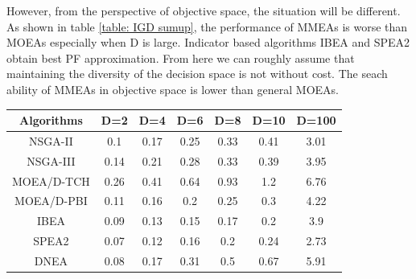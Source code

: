 \documentclass[conference]{IEEEtran}
\begin{document}
 However, from the perspective of objective space, the situation will be different. As shown in table \ref{table: IGD sumup}, the performance of MMEAs is worse than MOEAs especially when D is large. Indicator based algorithms IBEA and SPEA2 obtain best PF approximation. From here we can roughly assume that maintaining the diversity of the decision space is not without cost. The seach ability of MMEAs in objective space is lower than general MOEAs.

\begin{table}[htbp]
\begin{tabular}{@{}ccccccc@{}}
\toprule
Algorithms      & D=2                          & D=4                          & D=6                          & D=8                          & D=10                        & D=100                        \\ \midrule
NSGA-II         & 0.1                          & 0.17                         & 0.25                         & 0.33                         & 0.41                        & 3.01                         \\
NSGA-III        & 0.14                         & 0.21                         & 0.28                         & 0.33                         & 0.39                        & 3.95                         \\
MOEA/D-TCH      & 0.26                         & 0.41                         & 0.64                         & 0.93                         & 1.2                         & 6.76                         \\
MOEA/D-PBI      & 0.11                         & 0.16                         & 0.2                          & 0.25                         & 0.3                         & 4.22                         \\
\cellcolor[HTML]{F8FF00}IBEA            & 0.09                         & 0.13                         & \cellcolor[HTML]{F8FF00}0.15 & \cellcolor[HTML]{F8FF00}0.17 & \cellcolor[HTML]{F8FF00}0.2 & 3.9                          \\
\cellcolor[HTML]{F8FF00}SPEA2           & \cellcolor[HTML]{F8FF00}0.07 & \cellcolor[HTML]{F8FF00}0.12 & 0.16                         & 0.2                          & 0.24                        & \cellcolor[HTML]{F8FF00}2.73 \\
DNEA            & 0.08                         & 0.17                         & 0.31                         & 0.5                          & 0.67                        & 5.91                         \\

\end{tabular}
\end{table}
\end{document}
